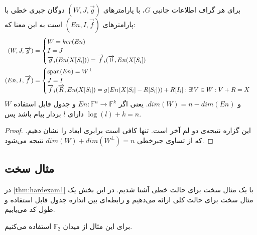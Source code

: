 \begin{theorem}
    \label{thm1}
    برای هر گراف اطلاعات جانبی 
    $G$، 
    \lpsicod
    با پارامترهای
     $(W, J, \overrightarrow{g})$
     دوگان جبری خطی
      \lpicod
      با پارامترهای
       $(En, I, \overrightarrow{f})$ 
      است به این معنا که:
    \begin{align*}
    (W, J, \overrightarrow{g}) &= \begin{cases}
                                      W = ker(En)\\
                                      I = J \\
                                      \overrightarrow{g}_i(En(X[S_i])) = \overrightarrow{f}_i(\overrightarrow{0}, En(X[S_i])\\
    \end{cases} \\
    (En, I, \overrightarrow{f}) &= \begin{cases}
                                       \operatorname{span}(En) = W^{\bot} \\
                                       J = I \\
                                       \overrightarrow{f}_i(\overrightarrow{R}, En(X[S_i]) = g(En(X[S_i] - R[S_i])) + R[I_i]: \exists! V \in W: V + R = X \\
    \end{cases}
    \end{align*}
    و 
    $dim(W) = n - dim(En)$.
     یعنی اگر
     $En: \mathbb{F}^n \rightarrow \mathbb{F}^k$
      و جدول قابل استفاده
      $W$
       دارای 
       $l$
       بردار پیام باشد پس 
       $\log(l) + k = n$.
\end{theorem}
\begin{proof}
    این گزاره نتیجه‌ی دو لم آخر است. تنها کافی است برابری ابعاد را نشان دهیم. که از تساوی جبرخطی 
    $dim(W) + dim(W^{\bot}) = n$ 
    نتیجه می‌شود.
\end{proof}

\subsection{
	مثال سخت
}
در 
\autoref{thm:hardexam1}
با یک مثال سخت برای حالت خطی آشنا شدیم. در این بخش یک مثال سخت برای حالت کلی ارائه می‌دهیم و رابطه‌ای بین اندازه جدول قابل استفاده و طول کد می‌یابیم.

برای این مثال از میدان 
$\mathbb{F}_2$
استفاده می‌کنیم.

